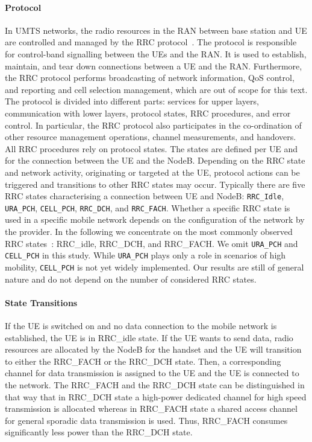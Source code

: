 \paragraph*{ Protocol} In \gls{UMTS} networks, the radio resources in the \gls{RAN} between base station and UE are controlled and managed by the \gls{RRC} protocol~\cite{3GPP_RRC_Spec}.
The protocol is responsible for control-band signalling between the \glspl{UE} and the \gls{RAN}.
It is used to establish, maintain, and tear down connections between a \gls{UE} and the \gls{RAN}.
Furthermore, the \gls{RRC} protocol performs broadcasting of network information, \gls{QoS} control, and reporting and cell selection management, which are out of scope for this text.
The protocol is divided into different parts: services for upper layers, communication with lower layers, protocol states, \gls{RRC} procedures, and error control.
In particular, the \gls{RRC} protocol also participates in the co-ordination of other resource management operations, channel measurements, and handovers.
All \gls{RRC} procedures rely on protocol states.
The states are defined per \gls{UE} and for the connection between the \gls{UE} and the NodeB.
Depending on the \gls{RRC} state and network activity, originating or targeted at the \gls{UE}, protocol actions can be triggered and transitions to other \gls{RRC} states may occur.
Typically there are five \gls{RRC} states characterising a connection between \gls{UE} and NodeB: \texttt{RRC\_Idle}, \texttt{URA\_PCH}, \texttt{CELL\_PCH}, \texttt{RRC\_DCH}, and \texttt{RRC\_FACH}.
Whether a specific \gls{RRC} state is used in a specific mobile network depends on the configuration of the network by the provider.
In the following we concentrate on the most commonly observed \gls{RRC} states~\cite{Qian2010a}: \gls{RRC_idle}, \gls{RRC_DCH}, and \gls{RRC_FACH}.
We omit \texttt{URA\_PCH} and \texttt{CELL\_PCH} in this study.
While \texttt{URA\_PCH} plays only a role in scenarios of high mobility, \texttt{CELL\_PCH} is not yet widely implemented.
Our results are still of general nature and do not depend on the number of considered \gls{RRC} states.

\paragraph*{ State Transitions} If the \gls{UE} is switched on and no data connection to the mobile network is established, the \gls{UE} is in \gls{RRC_idle} state.
If the \gls{UE} wants to send data, radio resources are allocated by the NodeB for the handset and the \gls{UE} will transition to either the \gls{RRC_FACH} or the \gls{RRC_DCH} state.
Then, a corresponding channel for data transmission is assigned to the \gls{UE} and the \gls{UE} is connected to the network.
The \gls{RRC_FACH} and the \gls{RRC_DCH} state can be distinguished in that way that in \gls{RRC_DCH} state a high-power dedicated channel for high speed transmission is allocated whereas in \gls{RRC_FACH} state a shared access channel for general sporadic data transmission is used.
Thus, \gls{RRC_FACH} consumes significantly less power than the \gls{RRC_DCH} state.


